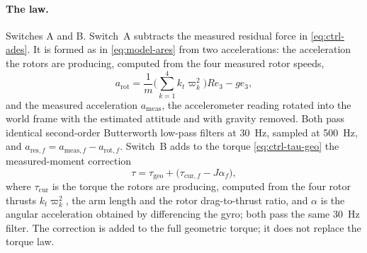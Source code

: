 \paragraph{The law.} Switches A and B. Switch~A subtracts the measured residual force in
\eqref{eq:ctrl-ades}. It is formed as in \eqref{eq:model-ares} from two accelerations: the
acceleration the rotors are producing, computed from the four measured rotor speeds,
\begin{equation*}
  a_{\mathrm{rot}} = \frac{1}{m}\Big(\sum_{k=1}^{4} k_t \varpi_k^2\Big) R e_3 - g e_3 ,
\end{equation*}
and the measured acceleration $a_{\mathrm{meas}}$, the accelerometer reading rotated into the world
frame with the estimated attitude and with gravity removed. Both pass identical second-order Butterworth low-pass filters at \SI{30}{\hertz},
sampled at \SI{500}{\hertz}, and $a_{\mathrm{res},f} = a_{\mathrm{meas},f} - a_{\mathrm{rot},f}$.
Switch~B adds to the torque \eqref{eq:ctrl-tau-geo} the measured-moment correction
%
\begin{equation}
  \tau = \tau_{\mathrm{geo}} + \big(\tau_{\mathrm{cur},f} - J \alpha_f\big),
  \label{eq:ctrl-s1-torque}
\end{equation}
%
where $\tau_{\mathrm{cur}}$ is the torque the rotors are producing, computed from the four rotor
thrusts $k_t\varpi_k^2$, the arm length and the rotor drag-to-thrust ratio, and $\alpha$ is the
angular acceleration obtained by differencing the gyro; both pass the same \SI{30}{\hertz} filter.
The correction is added to the full geometric torque; it does not replace the torque law.

